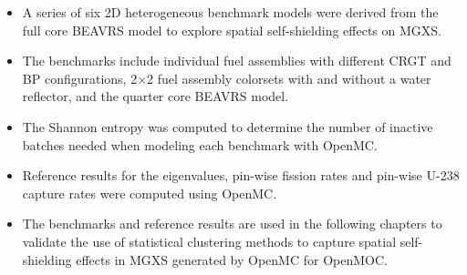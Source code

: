 \vfill
\begin{highlightsbox}[frametitle=Highlights]
\begin{itemize}
  \item A series of six 2D heterogeneous benchmark models were derived from the full core \ac{BEAVRS} model to explore spatial self-shielding effects on \ac{MGXS}.
  \item The benchmarks include individual fuel assemblies with different \ac{CRGT} and \ac{BP} configurations, 2$\times$2 fuel assembly colorsets with and without a water reflector, and the quarter core \ac{BEAVRS} model.
  \item The Shannon entropy was computed to determine the number of inactive batches needed when modeling each benchmark with OpenMC.
  \item Reference results for the eigenvalues, pin-wise fission rates and pin-wise U-238 capture rates were computed using OpenMC.
  \item The benchmarks and reference results are used in the following chapters to validate the use of statistical clustering methods to capture spatial self-shielding effects in \ac{MGXS} generated by OpenMC for OpenMOC.
\end{itemize}
\end{highlightsbox}
\vfill